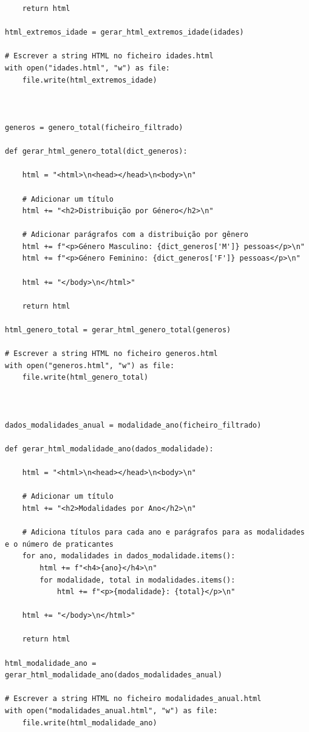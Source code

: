 \documentclass[11pt,a4paper]{report}%
\begin{document}
\begin{verbatim}
    return html

html_extremos_idade = gerar_html_extremos_idade(idades)

# Escrever a string HTML no ficheiro idades.html
with open("idades.html", "w") as file:
    file.write(html_extremos_idade)



generos = genero_total(ficheiro_filtrado)

def gerar_html_genero_total(dict_generos):

    html = "<html>\n<head></head>\n<body>\n"
    
    # Adicionar um título
    html += "<h2>Distribuição por Género</h2>\n"

    # Adicionar parágrafos com a distribuição por gênero
    html += f"<p>Género Masculino: {dict_generos['M']} pessoas</p>\n"
    html += f"<p>Género Feminino: {dict_generos['F']} pessoas</p>\n"
    
    html += "</body>\n</html>"

    return html

html_genero_total = gerar_html_genero_total(generos)

# Escrever a string HTML no ficheiro generos.html
with open("generos.html", "w") as file:
    file.write(html_genero_total)



dados_modalidades_anual = modalidade_ano(ficheiro_filtrado)

def gerar_html_modalidade_ano(dados_modalidade):

    html = "<html>\n<head></head>\n<body>\n"

    # Adicionar um título
    html += "<h2>Modalidades por Ano</h2>\n"

    # Adiciona títulos para cada ano e parágrafos para as modalidades e o número de praticantes
    for ano, modalidades in dados_modalidade.items():
        html += f"<h4>{ano}</h4>\n"
        for modalidade, total in modalidades.items():
            html += f"<p>{modalidade}: {total}</p>\n"

    html += "</body>\n</html>"

    return html

html_modalidade_ano = gerar_html_modalidade_ano(dados_modalidades_anual)

# Escrever a string HTML no ficheiro modalidades_anual.html
with open("modalidades_anual.html", "w") as file:
    file.write(html_modalidade_ano)




\end{verbatim}
\end{document}
